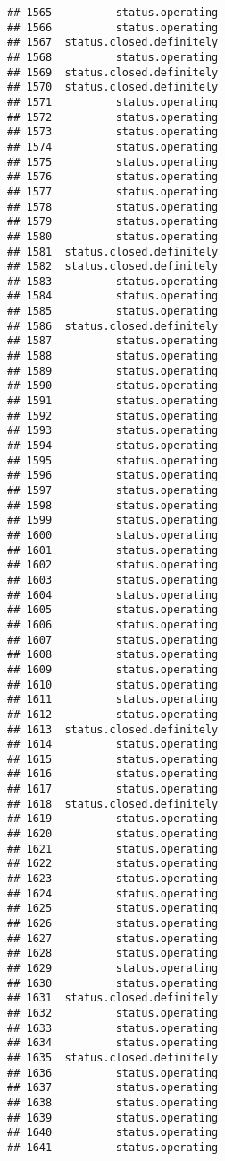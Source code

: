 \documentclass[
]{article}
\begin{document}
\begin{verbatim}
## 1565          status.operating
## 1566          status.operating
## 1567  status.closed.definitely
## 1568          status.operating
## 1569  status.closed.definitely
## 1570  status.closed.definitely
## 1571          status.operating
## 1572          status.operating
## 1573          status.operating
## 1574          status.operating
## 1575          status.operating
## 1576          status.operating
## 1577          status.operating
## 1578          status.operating
## 1579          status.operating
## 1580          status.operating
## 1581  status.closed.definitely
## 1582  status.closed.definitely
## 1583          status.operating
## 1584          status.operating
## 1585          status.operating
## 1586  status.closed.definitely
## 1587          status.operating
## 1588          status.operating
## 1589          status.operating
## 1590          status.operating
## 1591          status.operating
## 1592          status.operating
## 1593          status.operating
## 1594          status.operating
## 1595          status.operating
## 1596          status.operating
## 1597          status.operating
## 1598          status.operating
## 1599          status.operating
## 1600          status.operating
## 1601          status.operating
## 1602          status.operating
## 1603          status.operating
## 1604          status.operating
## 1605          status.operating
## 1606          status.operating
## 1607          status.operating
## 1608          status.operating
## 1609          status.operating
## 1610          status.operating
## 1611          status.operating
## 1612          status.operating
## 1613  status.closed.definitely
## 1614          status.operating
## 1615          status.operating
## 1616          status.operating
## 1617          status.operating
## 1618  status.closed.definitely
## 1619          status.operating
## 1620          status.operating
## 1621          status.operating
## 1622          status.operating
## 1623          status.operating
## 1624          status.operating
## 1625          status.operating
## 1626          status.operating
## 1627          status.operating
## 1628          status.operating
## 1629          status.operating
## 1630          status.operating
## 1631  status.closed.definitely
## 1632          status.operating
## 1633          status.operating
## 1634          status.operating
## 1635  status.closed.definitely
## 1636          status.operating
## 1637          status.operating
## 1638          status.operating
## 1639          status.operating
## 1640          status.operating
## 1641          status.operating

\end{verbatim}
\end{document}
